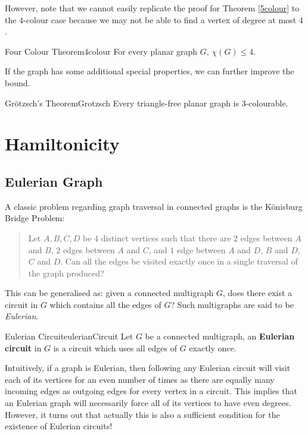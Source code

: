 \documentclass[math]{amznotes}
\theoremstyle{remark}
\begin{document}
However, note that we cannot easily replicate the proof for Theorem \ref{5colour} to the $4$-colour case because we may not be able to find a vertex of degree at most $4$. 
\begin{thmbox}{Four Colour Theorem}{4colour}
    For every planar graph $G$, $\chi(G) \leq 4$.
\end{thmbox}
If the graph has some additional special properties, we can further improve the bound.
\begin{thmbox}{Gr\"{o}tzsch's Theorem}{Grotzsch}
    Every triangle-free planar graph is $3$-colourable.
\end{thmbox}
\chapter{Hamiltonicity}
\section{Eulerian Graph}
A classic problem regarding graph traversal in connected graphs is the K\"{o}nisburg Bridge Problem:
\begin{quote}
    Let $A, B, C, D$ be $4$ distinct vertices such that there are $2$ edges between $A$ and $B$, $2$ edges between $A$ and $C$, and $1$ edge between $A$ and $D$, $B$ and $D$, $C$ and $D$. Can all the edges be visited exactly once in a single traversal of the graph produced?
\end{quote}
This can be generalised as: given a connected multigraph $G$, does there exist a circuit in $G$ which contains all the edges of $G$? Such multigraphs are said to be \textit{Eulerian}.
\begin{dfnbox}{Eulerian Circuit}{eulerianCircuit}
    Let $G$ be a connected multigraph, an {\color{red} \textbf{Eulerian circuit}} in $G$ is a circuit which uses all edges of $G$ exactly once.
\end{dfnbox}
Intuitively, if a graph is Eulerian, then following any Eulerian circuit will visit each of its vertices for an even number of times as there are equally many incoming edges as outgoing edges for every vertex in a circuit. This implies that an Eulerian graph will necessarily force all of its vertices to have even degrees. However, it turns out that actually this is also a sufficient condition for the existence of Eulerian circuits!
\end{document}
